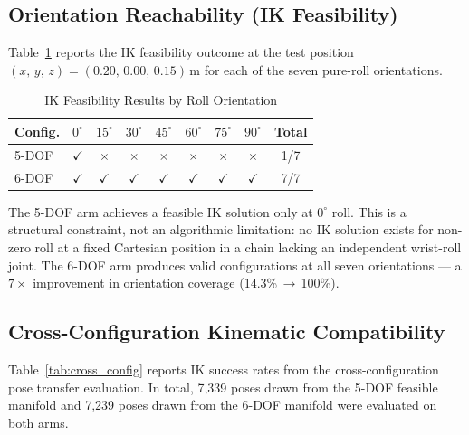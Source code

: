 \documentclass[conference]{IEEEtran}
\begin{document}
	\subsection{Orientation Reachability (IK Feasibility)}
	
	Table~\ref{tab:ik_results} reports the IK feasibility outcome at the
	test position $(x,\,y,\,z) = (0.20,\,0.00,\,0.15)$\,m for each of
	the seven pure-roll orientations.
	
	\begin{table}[t]
		\centering
		\caption{IK Feasibility Results by Roll Orientation}
		\label{tab:ik_results}
		\renewcommand{\arraystretch}{1.2}
		\small
		\begin{tabular}{lcccccccc}
			\toprule
			\textbf{Config.} & $0^\circ$ & $15^\circ$ & $30^\circ$ & $45^\circ$ & $60^\circ$ & $75^\circ$ & $90^\circ$ & \textbf{Total} \\
			\midrule
			5-DOF & $\checkmark$ & $\times$ & $\times$ & $\times$ & $\times$ & $\times$ & $\times$ & 1/7 \\
			6-DOF & $\checkmark$ & $\checkmark$ & $\checkmark$ & $\checkmark$ & $\checkmark$ & $\checkmark$ & $\checkmark$ & 7/7 \\
			\bottomrule
		\end{tabular}
	\end{table}
	
	The 5-DOF arm achieves a feasible IK solution only at $0^\circ$ roll.
	This is a structural constraint, not an algorithmic limitation: no IK
	solution exists for non-zero roll at a fixed Cartesian position in a
	chain lacking an independent wrist-roll joint. The 6-DOF arm produces
	valid configurations at all seven orientations --- a $7\times$
	improvement in orientation coverage (14.3\%\,$\rightarrow$\,100\%).
	
	\subsection{Cross-Configuration Kinematic Compatibility}
	
	Table~\ref{tab:cross_config} reports IK success rates from the
	cross-configuration pose transfer evaluation. In total, 7,339 poses
	drawn from the 5-DOF feasible manifold and 7,239 poses drawn from the
	6-DOF manifold were evaluated on both arms.
	
\end{document}
